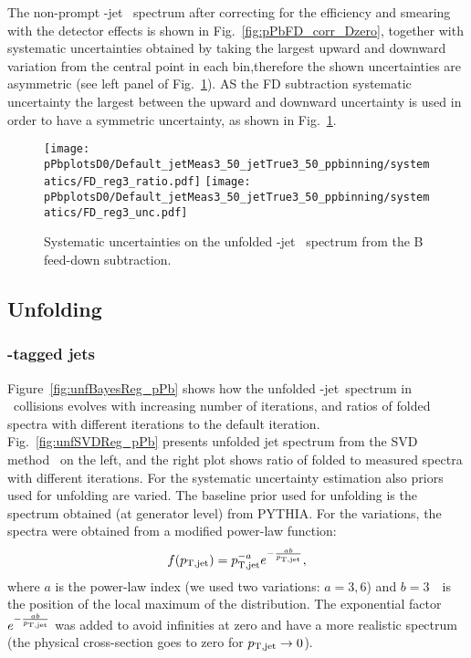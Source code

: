 The non-prompt \Dzero-jet \pt\ spectrum after correcting for the efficiency and smearing with the detector effects is shown in Fig.~\ref{fig:pPbFD_corr_Dzero}, together with systematic uncertainties obtained by taking the largest upward and downward variation from the central point in each bin,therefore the shown uncertainties are asymmetric (see left panel of Fig.~\ref{fig:BFeedDown_sysUnc_Dzero}). AS the FD subtraction systematic uncertainty the largest between the upward and downward uncertainty is used in order to have a symmetric uncertainty, as shown in Fig.~\ref{fig:BFeedDown_sysUnc_Dzero}.

\begin{figure}[bth]
\begin{center}
\texttt{[image: pPbplotsD0/Default\_jetMeas3\_50\_jetTrue3\_50\_ppbinning/systematics/FD\_reg3\_ratio.pdf]}
\texttt{[image: pPbplotsD0/Default\_jetMeas3\_50\_jetTrue3\_50\_ppbinning/systematics/FD\_reg3\_unc.pdf]}
\caption{Systematic uncertainties on the unfolded \Dzero-jet \pt\ spectrum from the B feed-down subtraction.} 
\label{fig:BFeedDown_sysUnc_Dzero}
\end{center}
\end{figure}


\subsection{Unfolding}
\label{sUnfoldSys}

\subsubsection{\Dstar-tagged jets}

Figure~\ref{fig:unfBayesReg_pPb} shows how the unfolded  \Dstar-jet\ spectrum in \pPb\ collisions evolves with increasing number of iterations, and ratios of folded spectra with different iterations to the default iteration.
Fig.~\ref{fig:unfSVDReg_pPb} presents unfolded jet spectrum from the SVD method~\cite{Hocker:1995} on the left, and the right plot shows ratio of folded to measured spectra with different iterations.
For the systematic uncertainty estimation also priors used for unfolding are varied. The baseline prior used for unfolding is the spectrum obtained (at generator level) from PYTHIA.
For the variations, the spectra were obtained from a modified power-law function:
\begin{equation}
f(p_{\mathrm{T,jet}}) = p_{\mathrm{T,jet}}^{-a}e^{-\frac{ab}{p_{\mathrm{T,jet}}}},
\end{equation}
where $a$ is the power-law index (we used two variations: $a=3,6$) and $b=3$~\GeVc\ is the position of the local maximum of the distribution. The exponential factor $e^{-\frac{ab}{p_{\mathrm{T,jet}}}}$ was added
to avoid infinities at zero and have a more realistic spectrum (the physical cross-section goes to zero for $p_{\mathrm{T,jet}} \to 0$).

